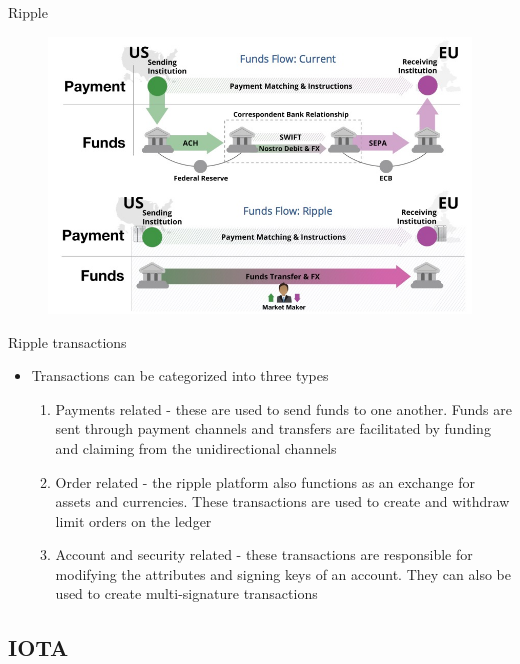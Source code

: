 \documentclass[9pt]{beamer}
\begin{document}
\begin{frame}{Ripple}
	\begin{figure}[]
		\centering
		\includegraphics  [scale=0.3]{Images/ripple}
	\end{figure}
\end{frame}


\begin{frame}{Ripple transactions}
	\begin{itemize}
		\item Transactions can be categorized into three types
		\begin{enumerate}
			\item Payments related - these are used to send funds to one another. Funds are sent through payment channels and transfers are facilitated by funding and claiming from the unidirectional channels
			\item Order related - the ripple platform also functions as an exchange for assets and currencies. These transactions are used to create and withdraw limit orders on the ledger
			\item Account and security related - these transactions are responsible for modifying the attributes and signing keys of an account. They can also be used to create multi-signature transactions
		\end{enumerate}
	\end{itemize}
\end{frame}


\subsection{IOTA}
\end{document}
